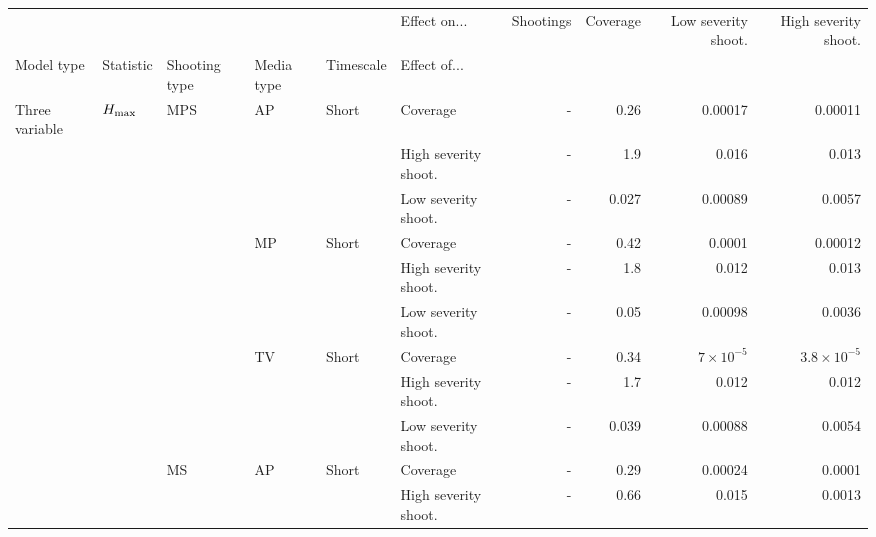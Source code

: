 \documentclass[article]{standalone}
\begin{document}
\begin{tabular}{llllllrrrr}
\toprule
             &                   &    &    &       & Effect on... &            Shootings &  Coverage &  Low severity shoot. &  High severity shoot. \\
Model type & Statistic & Shooting type & Media type & Timescale & Effect of... &                      &           &                      &                       \\
\midrule
Three variable & $H_{\rm{max}}$ & MPS & AP & Short & Coverage &                    - &      0.26 &              0.00017 &               0.00011 \\
             &                   &    &    &       & High severity shoot. &                    - &       1.9 &                0.016 &                 0.013 \\
             &                   &    &    &       & Low severity shoot. &                    - &     0.027 &              0.00089 &                0.0057 \\
             &                   &    & MP & Short & Coverage &                    - &      0.42 &               0.0001 &               0.00012 \\
             &                   &    &    &       & High severity shoot. &                    - &       1.8 &                0.012 &                 0.013 \\
             &                   &    &    &       & Low severity shoot. &                    - &      0.05 &              0.00098 &                0.0036 \\
             &                   &    & TV & Short & Coverage &                    - &      0.34 &   $7 \times 10^{-5}$ &  $3.8 \times 10^{-5}$ \\
             &                   &    &    &       & High severity shoot. &                    - &       1.7 &                0.012 &                 0.012 \\
             &                   &    &    &       & Low severity shoot. &                    - &     0.039 &              0.00088 &                0.0054 \\
             &                   & MS & AP & Short & Coverage &                    - &      0.29 &              0.00024 &                0.0001 \\
             &                   &    &    &       & High severity shoot. &                    - &      0.66 &                0.015 &                0.0013 \\

\end{tabular}
\end{document}

